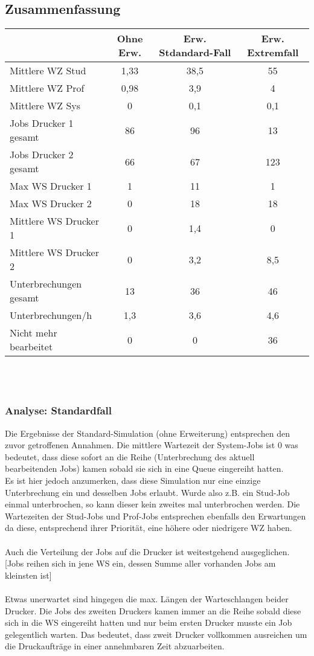 \documentclass[12pt,a4paper]{article}
\begin{document}
		\subsection{Zusammenfassung}
				\begin{tabular}{|l|c|c|c|}
					\hline  & Ohne Erw. & Erw. Stdandard-Fall & Erw. Extremfall \\ 
					\hline Mittlere WZ Stud 	   & 1,33 & 38,5 & 55 \\ 
					\hline Mittlere WZ Prof 	   & 0,98 & 3,9 & 4 \\ 
					\hline Mittlere WZ Sys 		   & 0 & 0,1 & 0,1 \\ 
					\hline Jobs Drucker 1 gesamt   & 86 & 96 & 13 \\ 
					\hline Jobs Drucker 2 gesamt   & 66 & 67 & 123 \\ 
					\hline Max WS Drucker 1 	   & 1 & 11 & 1 \\ 
					\hline Max WS Drucker 2 	   & 0 & 18 & 18 \\ 
					\hline Mittlere WS Drucker 1   & 0 & 1,4 & 0 \\ 
					\hline Mittlere WS Drucker 2   & 0 & 3,2 & 8,5 \\
					\hline Unterbrechungen gesamt  & 13 & 36 & 46 \\  
					\hline Unterbrechungen/h 	   & 1,3 & 3,6 & 4,6 \\ 
					\hline Nicht mehr bearbeitet   & 0 & 0 & 36 \\
					\hline 
				\end{tabular}
		\\	
		\\
		\subsubsection{Analyse: Standardfall}
		Die Ergebnisse der Standard-Simulation (ohne Erweiterung) entsprechen den zuvor getroffenen Annahmen. Die mittlere Wartezeit der System-Jobs ist 0 was bedeutet, dass diese sofort an die Reihe
		 (Unterbrechung des aktuell bearbeitenden Jobs) kamen sobald sie sich in eine Queue eingereiht hatten. \\
		Es ist hier jedoch anzumerken, dass diese Simulation nur eine einzige Unterbrechung ein und desselben Jobs erlaubt. Wurde also z.B. ein Stud-Job einmal unterbrochen, so kann dieser kein zweites mal
		 unterbrochen werden.
		Die Wartezeiten der Stud-Jobs und Prof-Jobs entsprechen ebenfalls den Erwartungen da diese, entsprechend ihrer Priorität, eine höhere oder niedrigere WZ haben.\\
		\\
		Auch die Verteilung der Jobs auf die Drucker ist weitestgehend ausgeglichen.
		[Jobs reihen sich in jene WS ein, dessen Summe aller vorhanden Jobs am kleinsten ist]\\
		\\
		Etwas unerwartet sind hingegen die max. Längen der Warteschlangen beider Drucker. Die Jobs des zweiten Druckers kamen immer an die Reihe sobald diese sich in die WS eingereiht hatten und nur beim
		 ersten Drucker musste ein Job gelegentlich warten. Das bedeutet, dass zweit Drucker vollkommen ausreichen um die Druckaufträge in einer annehmbaren Zeit abzuarbeiten.\\
		
\end{document}
